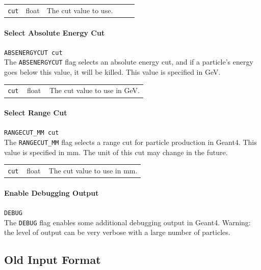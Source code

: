 \bigskip
\begin{tabular}{@{}llp{0.7\linewidth}}
    \texttt{cut} & float    & The cut value to use.
\end{tabular}

\paragraph{Select Absolute Energy Cut} \texttt{ABSENERGYCUT cut}\\

The \texttt{ABSENERGYCUT} flag selects an absolute energy cut, and if a particle's energy goes below this value, it will be killed.
This value is specified in GeV.

\bigskip
\begin{tabular}{@{}llp{0.7\linewidth}}
    \texttt{cut} & float    & The cut value to use in GeV.
\end{tabular}

\paragraph{Select Range Cut} \texttt{RANGECUT\_MM cut}\\

The \texttt{RANGECUT\_MM} flag selects a range cut for particle production in Geant4.
This value is specified in mm.
The unit of this cut may change in the future.

\bigskip
\begin{tabular}{@{}llp{0.7\linewidth}}
    \texttt{cut} & float    & The cut value to use in mm.
\end{tabular}

\paragraph{Enable Debugging Output} \texttt{DEBUG}\\

The \texttt{DEBUG} flag enables some additional debugging output in Geant4.
Warning: the level of output can be very verbose with a large number of particles.


\subsection{Old Input Format}\label{sec:coll:oldfmt}

